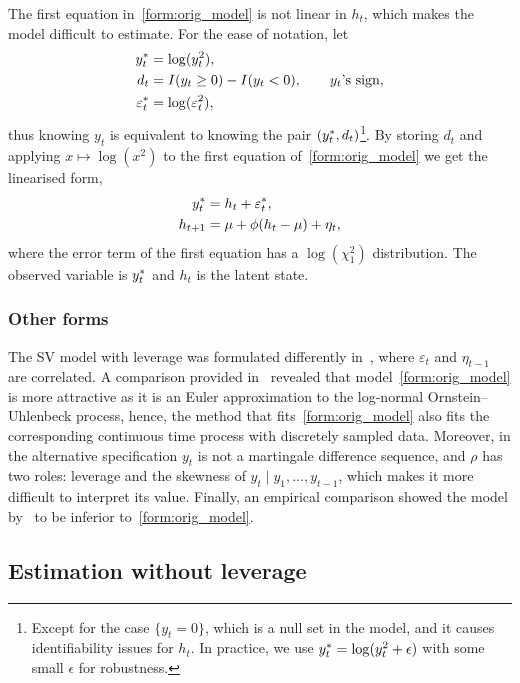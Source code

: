 The first equation in~\eqref{form:orig_model} is not linear in $h_t$, which makes the model difficult to estimate. For the ease of notation, let
\begin{align*}
y_t^\ast &=\log(y^2_t), \\
d_t &=I(y_t\ge0)-I(y_t<0), \qquad\text{$y_t$'s sign,} \\
\varepsilon_t^\ast &=\log(\varepsilon^2_t),
\end{align*}
thus knowing $y_t$ is equivalent to knowing the pair $(y_t^\ast, d_t)$\footnote{Except for the case $\{y_t=0\}$, which is a null set in the model, and it causes identifiability issues for $h_t$. In practice, we use $y_t^\ast =\log(y^2_t+\epsilon)$ with some small $\epsilon$ for robustness.}. By storing $d_t$ and applying $x\mapsto\log(x^2)$ to the first equation of~\eqref{form:orig_model} we get the linearised form,
\begin{align}
\begin{split}\label{form:lin_model}
y_t^\ast & = h_t+\varepsilon_t^\ast, \\
h_{t+1} & = \mu+\phi(h_t-\mu)+\eta_t,
\end{split}
\end{align}
where the error term of the first equation has a $\log(\chi_1^2)$ distribution. The observed variable is $y_t^\ast$ and $h_t$ is the latent state.

\subsubsection{Other forms}

The SV model with leverage was formulated differently in~\citet{Jacquier2004}, where $\varepsilon_t$ and $\eta_{t-1}$ are correlated.
A comparison provided in~\citet{yu2005leverage} revealed that model~\ref{form:orig_model} is more attractive as it is an Euler approximation to the log-normal Ornstein--Uhlenbeck process, hence, the method that fits~\ref{form:orig_model} also fits the corresponding continuous time process with discretely sampled data.
Moreover, in the alternative specification $y_t$ is not a martingale difference sequence, and $\rho$ has two roles: leverage and the skewness of $y_t\mid y_1,\dots,y_{t-1}$, which makes it more difficult to interpret its value.
Finally, an empirical comparison showed the model by~\citeauthor{Jacquier2004} to be inferior to~\ref{form:orig_model}.

\subsection{Estimation without leverage}

